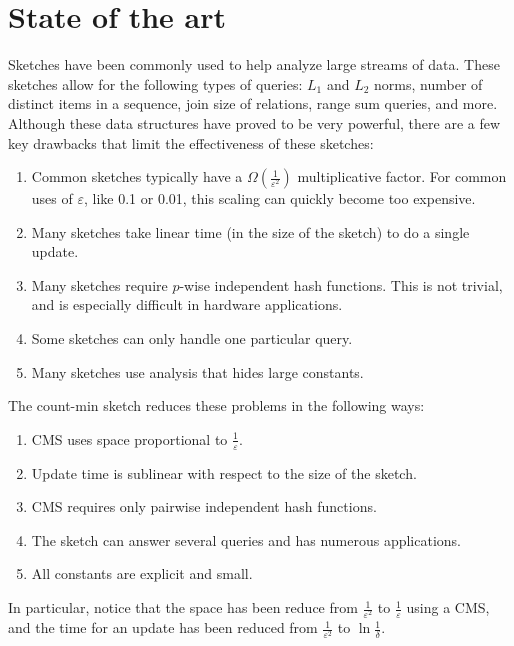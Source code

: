 \documentclass[11pt]{article}
\begin{document}
\section{State of the art}
Sketches have been commonly used to help analyze large streams of data. These sketches allow for the following types of queries: $L_1$ and $L_2$ norms, number of distinct items in a sequence, join size of relations, range sum queries, and more. Although these data structures have proved to be very powerful, there are a few key drawbacks that limit the effectiveness of these sketches:
\begin{enumerate}
    \item Common sketches typically have a $\Omega(\frac{1}{\varepsilon^2})$ multiplicative factor. For common uses of $\varepsilon$, like 0.1 or 0.01, this scaling can quickly become too expensive.
    \item Many sketches take linear time (in the size of the sketch) to do a single update. 
    \item Many sketches require $p$-wise independent hash functions. This is not trivial, and is especially difficult in hardware applications.
    \item Some sketches can only handle one particular query.
    \item Many sketches use analysis that hides large constants.
\end{enumerate}
The count-min sketch reduces these problems in the following ways:
\begin{enumerate}
    \item CMS uses space proportional to $\frac{1}{\varepsilon}$.
    \item Update time is sublinear with respect to the size of the sketch.
    \item CMS requires only pairwise independent hash functions.
    \item The sketch can answer several queries and has numerous applications.
    \item All constants are explicit and small.
\end{enumerate}
In particular, notice that the space has been reduce from $\frac{1}{\varepsilon^2}$ to $\frac{1}{\varepsilon}$ using a CMS, and the time for an update has been reduced from $\frac{1}{\varepsilon^2}$ to $\ln{\frac{1}{\delta}}$.
\end{document}
